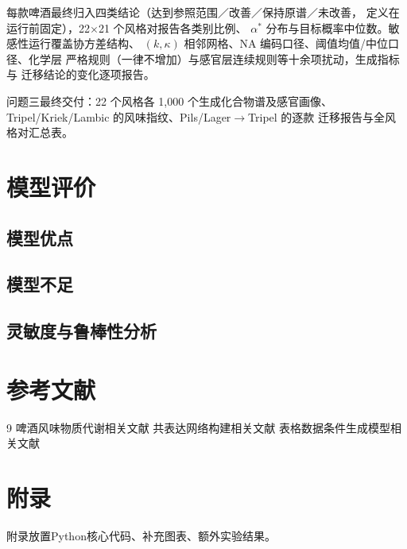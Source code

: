 \documentclass[12pt,a4paper]{article}
\begin{document}

每款啤酒最终归入四类结论（达到参照范围／改善／保持原谱／未改善，
定义在运行前固定），22$\times$21 个风格对报告各类别比例、
$\alpha^*$ 分布与目标概率中位数。敏感性运行覆盖协方差结构、
$(k,\kappa)$ 相邻网格、NA 编码口径、阈值均值/中位口径、化学层
严格规则（一律不增加）与感官层连续规则等十余项扰动，生成指标与
迁移结论的变化逐项报告。

问题三最终交付：22 个风格各 1{,}000 个生成化合物谱及感官画像、
Tripel/Kriek/Lambic 的风味指纹、Pils/Lager$\to$Tripel 的逐款
迁移报告与全风格对汇总表。
\section{模型评价}
\subsection{模型优点}
\subsection{模型不足}
\subsection{灵敏度与鲁棒性分析}

\section{参考文献}
\begin{thebibliography}{9}
 啤酒风味物质代谢相关文献
 共表达网络构建相关文献
 表格数据条件生成模型相关文献
\end{thebibliography}

\section{附录}
附录放置Python核心代码、补充图表、额外实验结果。
\end{document}
